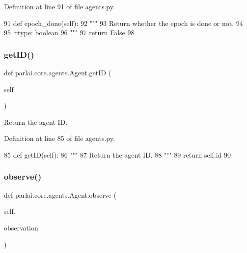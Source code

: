 Definition at line 91 of file agents.\+py.


\begin{DoxyCode}
91     \textcolor{keyword}{def }epoch\_done(self):
92         \textcolor{stringliteral}{"""}
93 \textcolor{stringliteral}{        Return whether the epoch is done or not.}
94 \textcolor{stringliteral}{}
95 \textcolor{stringliteral}{        :rtype: boolean}
96 \textcolor{stringliteral}{        """}
97         \textcolor{keywordflow}{return} \textcolor{keyword}{False}
98 
\end{DoxyCode}
\mbox{\label{classparlai_1_1core_1_1agents_1_1Agent_a29e1cdd729ac4236f8bae90b2e66fa04}} 
\subsubsection{\texorpdfstring{get\+I\+D()}{getID()}}
{\footnotesize\ttfamily def parlai.\+core.\+agents.\+Agent.\+get\+ID (\begin{DoxyParamCaption}\item[{}]{self }\end{DoxyParamCaption})}

\begin{DoxyVerb}Return the agent ID.
\end{DoxyVerb}
 

Definition at line 85 of file agents.\+py.


\begin{DoxyCode}
85     \textcolor{keyword}{def }getID(self):
86         \textcolor{stringliteral}{"""}
87 \textcolor{stringliteral}{        Return the agent ID.}
88 \textcolor{stringliteral}{        """}
89         \textcolor{keywordflow}{return} self.id
90 
\end{DoxyCode}
\mbox{\label{classparlai_1_1core_1_1agents_1_1Agent_a98041e2d186aa81bd5e1649a91f623bc}} 
\subsubsection{\texorpdfstring{observe()}{observe()}}
{\footnotesize\ttfamily def parlai.\+core.\+agents.\+Agent.\+observe (\begin{DoxyParamCaption}\item[{}]{self,  }\item[{}]{observation }\end{DoxyParamCaption})}

